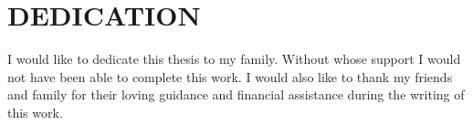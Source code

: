\chapter*{DEDICATION}

I would like to dedicate this thesis to my family. Without whose support I would not have
been able to complete this work.
I would also like to thank my friends and family for their loving guidance and
financial assistance during the writing of this work.

